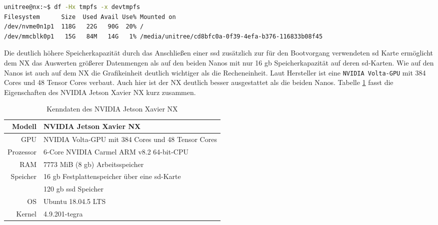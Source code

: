 \begin{lstlisting}[language=sh, label=lst:nx-fs,columns=fixed]
unitree@nx:~$ df -Hx tmpfs -x devtmpfs
Filesystem      Size  Used Avail Use% Mounted on
/dev/nvme0n1p1  118G   22G   90G  20% /
/dev/mmcblk0p1   15G   84M   14G   1% /media/unitree/cd8bfc0a-0f39-4efa-b376-116833b08f45
\end{lstlisting}

Die deutlich höhere Speicherkapazität durch das Anschließen einer \gls{ssd} zusätzlich zur für den Bootvorgang verwendeten
\gls{sd} Karte ermöglicht dem NX das Auswerten größerer Datenmengen als auf den beiden Nanos mit nur \num{16} \gls{gb}
Speicherkapazität auf deren \gls{sd}-Karten.
Wie auf den Nanos ist auch auf dem NX die Grafikeinheit deutlich wichtiger als die Recheneinheit.
Laut Hersteller ist eine \texttt{NVIDIA Volta-GPU} mit 384 Cores und 48 Tensor Cores verbaut.
Auch hier ist der NX deutlich besser ausgestattet als die beiden Nanos.
Tabelle \ref{tab:data-nx} fasst die Eigenschaften des NVIDIA Jetson Xavier NX kurz zusammen.

\begin{table}[h]
    \centering
    \begin{tabular}{|r|l|}
        \hline
        Modell    & NVIDIA Jetson Xavier NX\\ \hline
        GPU       & NVIDIA Volta-GPU mit 384 Cores und 48 Tensor Cores \\ \hline
        Prozessor & 6-Core NVIDIA Carmel ARM v8.2 64-bit-CPU\\ \hline
        RAM       & \num{7773} MiB (\num{8} \gls{gb}) Arbeitsspeicher\\ \hline
        Speicher  & \num{16} \gls{gb} Festplattenspeicher über eine \gls{sd}-Karte\\
                  & \num{120} \gls{gb} \gls{ssd} Speicher \\ \hline
        OS        & Ubuntu 18.04.5 LTS\\ \hline
        Kernel    & 4.9.201-tegra \\ \hline
    \end{tabular}\caption{Kenndaten des NVIDIA Jetson Xavier NX}\label{tab:data-nx}
\end{table}





